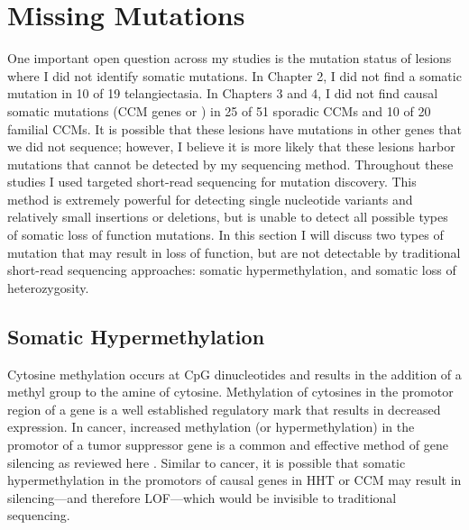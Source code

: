 \section{Missing Mutations}
One important open question across my studies is the mutation status of lesions where I did not identify somatic mutations. In Chapter 2, I did not find a somatic mutation in 10 of 19 telangiectasia. In Chapters 3 and 4, I did not find causal somatic mutations (CCM genes or ) in 25 of 51 sporadic CCMs and 10 of 20 familial CCMs. It is possible that these lesions have mutations in other genes that we did not sequence; however, I believe it is more likely that these lesions harbor mutations that cannot be detected by my sequencing method. Throughout these studies I used targeted short-read sequencing for mutation discovery. This method is extremely powerful for detecting single nucleotide variants and relatively small insertions or deletions, but is unable to detect all possible types of somatic loss of function mutations. In this section I will discuss two types of mutation that may result in loss of function, but are not detectable by traditional short-read sequencing approaches: somatic hypermethylation, and somatic loss of heterozygosity. 

\subsection{Somatic Hypermethylation}
Cytosine methylation occurs at CpG dinucleotides and results in the addition of a methyl group  to the amine of cytosine.  Methylation of cytosines in the promotor region of a gene is a well established regulatory mark that results in decreased expression. In cancer, increased methylation (or hypermethylation) in the promotor of a tumor suppressor gene is a common and effective method of gene silencing as reviewed here \citep{baylin2005}. Similar to cancer, it is possible that somatic hypermethylation in the promotors of causal genes in HHT or CCM may result in silencing---and therefore LOF---which would be invisible to traditional sequencing.

